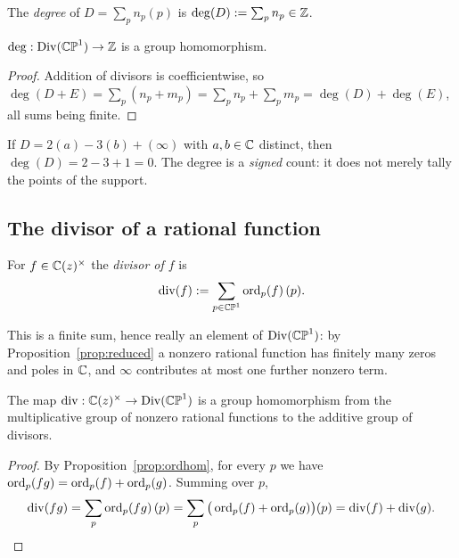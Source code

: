 \begin{definition}\label{def:deg}
The \emph{degree} of $D = \sum_p n_p (p)$ is $\deg(D) := \sum_p n_p \in \mathbb{Z}$.
\end{definition}

\begin{smjproposition}
$\deg : \operatorname{Div}(\mathbb{CP}^1) \to \mathbb{Z}$ is a group homomorphism.
\end{smjproposition}

\begin{proof}
Addition of divisors is coefficientwise, so
$\deg(D + E) = \sum_p (n_p + m_p) = \sum_p n_p + \sum_p m_p = \deg(D)+\deg(E)$,
all sums being finite.
\end{proof}

\begin{example}
If $D = 2(a) - 3(b) + (\infty)$ with $a,b \in \mathbb{C}$ distinct, then
$\deg(D) = 2 - 3 + 1 = 0$. The degree is a \emph{signed} count: it does not merely
tally the points of the support.
\end{example}

\subsection{The divisor of a rational function}

\begin{definition}\label{def:divmap}
For $f \in \mathbb{C}(z)^\times$ the \emph{divisor of $f$} is
\[
\operatorname{div}(f) := \sum_{p \in \mathbb{CP}^1} \operatorname{ord}_p(f)\,(p) .
\]
\end{definition}

This is a finite sum, hence really an element of $\operatorname{Div}(\mathbb{CP}^1)$: by
Proposition~\ref{prop:reduced} a nonzero rational function has finitely many
zeros and poles in $\mathbb{C}$, and $\infty$ contributes at most one further nonzero
term.

\begin{smjproposition}\label{prop:divhom}
The map $\operatorname{div} : \mathbb{C}(z)^\times \to \operatorname{Div}(\mathbb{CP}^1)$ is a group homomorphism from the
multiplicative group of nonzero rational functions to the additive group of
divisors.
\end{smjproposition}

\begin{proof}
By Proposition~\ref{prop:ordhom}, for every $p$ we have
$\operatorname{ord}_p(fg) = \operatorname{ord}_p(f) + \operatorname{ord}_p(g)$. Summing over $p$,
\[
\operatorname{div}(fg) = \sum_p \operatorname{ord}_p(fg)\,(p) = \sum_p \big(\operatorname{ord}_p(f)+\operatorname{ord}_p(g)\big)(p)
= \operatorname{div}(f) + \operatorname{div}(g). \qedhere
\]
\end{proof}

